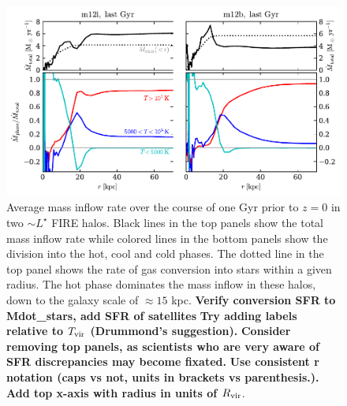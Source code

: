 \documentclass[fleqn,usenatbib]{mnras}
\newcommand{\Rvir}{R_{\rm vir}}
\begin{document}
\begin{figure}
    \centering
    \includegraphics{figures/Mdot_normalized.pdf}
    \caption{
    Average mass inflow rate over the course of one Gyr prior to $z=0$ in two $\sim L^\star$ FIRE halos.
    Black lines in the top panels show the total mass inflow rate while colored lines in the bottom panels show the division into the hot, cool and cold phases.
    The dotted line in the top panel shows the rate of gas conversion into stars within a given radius.
    The hot phase dominates the mass inflow in these halos, down to the galaxy scale of $\approx15$ kpc.
    \textbf{Verify conversion SFR to Mdot\_stars, add SFR of satellites}
    \textbf{Try adding labels relative to $T_{\rm vir}$ (Drummond's suggestion).}
    \textbf{Consider removing top panels, as scientists who are very aware of SFR discrepancies may become fixated.}
    \textbf{Use consistent r notation (caps vs not, units in brackets vs parenthesis.).}
    \textbf{Add top x-axis with radius in units of $\Rvir$}.
    }
    \label{f: Mdot}
\end{figure}
\end{document}
